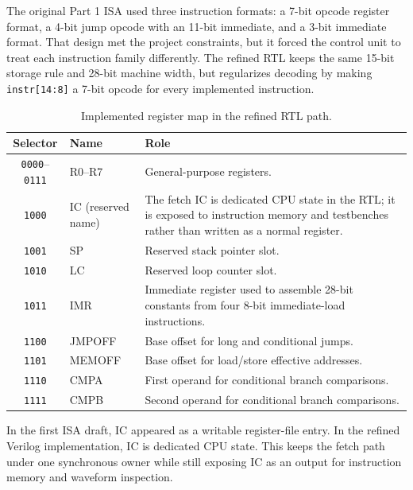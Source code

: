 \documentclass[12pt,a4paper]{article}
\begin{document}
The original Part 1 ISA used three instruction formats: a 7-bit opcode register format, a 4-bit jump opcode with an 11-bit immediate, and a 3-bit immediate format. That design met the project constraints, but it forced the control unit to treat each instruction family differently. The refined RTL keeps the same 15-bit storage rule and 28-bit machine width, but regularizes decoding by making \texttt{instr[14:8]} a 7-bit opcode for every implemented instruction.

\begin{table}[H]
\centering
\caption{Implemented register map in the refined RTL path.}
\begin{tabularx}{\linewidth}{|c|l|Y|}
\hline
\textbf{Selector} & \textbf{Name} & \textbf{Role} \\ \hline
\texttt{0000}--\texttt{0111} & R0--R7 & General-purpose registers. \\ \hline
\texttt{1000} & IC (reserved name) & The fetch IC is dedicated CPU state in the RTL; it is exposed to instruction memory and testbenches rather than written as a normal register. \\ \hline
\texttt{1001} & SP & Reserved stack pointer slot. \\ \hline
\texttt{1010} & LC & Reserved loop counter slot. \\ \hline
\texttt{1011} & IMR & Immediate register used to assemble 28-bit constants from four 8-bit immediate-load instructions. \\ \hline
\texttt{1100} & JMPOFF & Base offset for long and conditional jumps. \\ \hline
\texttt{1101} & MEMOFF & Base offset for load/store effective addresses. \\ \hline
\texttt{1110} & CMPA & First operand for conditional branch comparisons. \\ \hline
\texttt{1111} & CMPB & Second operand for conditional branch comparisons. \\ \hline
\end{tabularx}
\end{table}

\begin{tipbox}
In the first ISA draft, IC appeared as a writable register-file entry. In the refined Verilog implementation, IC is dedicated CPU state. This keeps the fetch path under one synchronous owner while still exposing IC as an output for instruction memory and waveform inspection.
\end{tipbox}
\end{document}
